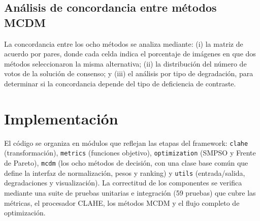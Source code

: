 \subsection{Análisis de concordancia entre métodos MCDM}

La concordancia entre los ocho métodos se analiza mediante: (i) la matriz de acuerdo por pares, donde cada celda indica el porcentaje de imágenes en que dos métodos seleccionaron la misma alternativa; (ii) la distribución del número de votos de la solución de consenso; y (iii) el análisis por tipo de degradación, para determinar si la concordancia depende del tipo de deficiencia de contraste.

\section{Implementación}

El código se organiza en módulos que reflejan las etapas del framework: \texttt{clahe} (transformación), \texttt{metrics} (funciones objetivo), \texttt{optimization} (SMPSO y Frente de Pareto), \texttt{mcdm} (los ocho métodos de decisión, con una clase base común que define la interfaz de normalización, pesos y ranking) y \texttt{utils} (entrada/salida, degradaciones y visualización). La correctitud de los componentes se verifica mediante una suite de pruebas unitarias e integración (59 pruebas) que cubre las métricas, el procesador CLAHE, los métodos MCDM y el flujo completo de optimización.
